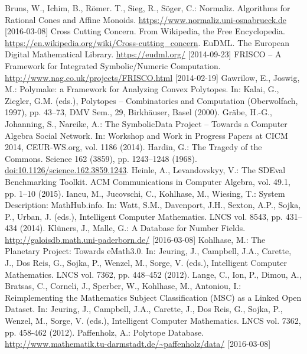 \documentclass{llncs}
\newcommand{\SD}{{\sc Symbo\-lic\-Data}}
\begin{document}
\raggedright
\begin{thebibliography}{xxx}
 Bruns, W., Ichim, B., R\"omer. T., Sieg, R., S\"oger, C.:
  Normaliz. Algorithms for Rational Cones and Affine Monoids.
  \url{https://www.normaliz.uni-osnabrueck.de} [2016-03-08]
 Cross Cutting Concern. From Wikipedia, the Free Encyclopedia.
  \url{https://en.wikipedia.org/wiki/Cross-cutting_concern}.
 EuDML. The European Digital Mathematical Library.
  \url{https://eudml.org/} [2014-09-23]
 FRISCO -- A Framework for Integrated Symbolic/Numeric
  Computation. \url{http://www.nag.co.uk/projects/FRISCO.html} [2014-02-19]
 Gawrilow, E., Joswig, M.: Polymake: a Framework for
  Analyzing Convex Polytopes. In: Kalai, G., Ziegler, G.M. (eds.), Polytopes --
  Combinatorics and Computation (Oberwolfach, 1997), pp. 43--73, DMV Sem., 29,
  Birkh\"auser, Basel (2000). 
 Gr\"abe, H.-G., Johanning, S., Nareike, A.: The {\SD} Project
  -- Towards a Computer Algebra Social Network. In: Workshop and Work in
  Progress Papers at CICM 2014, CEUR-WS.org, vol. 1186 (2014).
 Hardin, G.: The Tragedy of the Commons. Science 162 (3859),
  pp. 1243--1248 (1968). \url{doi:10.1126/science.162.3859.1243}. 
 Heinle, A., Levandovskyy, V.: The SDEval Benchmarking
  Toolkit. ACM Communications in Computer Algebra, vol. 49.1, pp. 1--10 (2015).
 Iancu, M., Jucovschi, C., Kohlhase, M., Wiesing, T.: System
  Description: MathHub.info. In: Watt, S.M., Davenport, J.H., Sexton, A.P.,
  Sojka, P., Urban, J. (eds.), Intelligent Computer Mathematics. LNCS vol.
  8543, pp. 431--434 (2014).
 Kl\"uners, J., Malle, G.: A Database for Number Fields.
  \url{http://galoisdb.math.uni-paderborn.de/} [2016-03-08]
 Kohlhase, M.: The Planetary Project: Towards eMath3.0. In:
  Jeuring, J., Campbell, J.A., Carette, J., Dos Reis, G., Sojka, P., Wenzel,
  M., Sorge, V. (eds.), Intelligent Computer Mathematics.  LNCS vol. 7362,
  pp. 448--452 (2012).
 Lange, C., Ion, P., Dimou, A., Bratsas, C., Corneli, J.,
  Sperber, W., Kohlhase, M., Antoniou, I.: Reimplementing the Mathematics
  Subject Classification (MSC) as a Linked Open Dataset.  In: Jeuring, J.,
  Campbell, J.A., Carette, J., Dos Reis, G., Sojka, P., Wenzel, M., Sorge,
  V. (eds.), Intelligent Computer Mathematics.  LNCS vol. 7362, pp. 458-462
  (2012).
 Paffenholz, A.: Polytope Database.
  \url{http://www.mathematik.tu-darmstadt.de/~paffenholz/data/}  [2016-03-08] 

\end{thebibliography}
\end{document}
